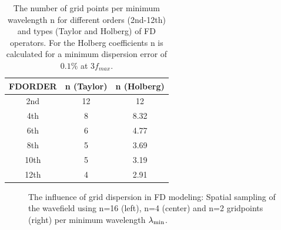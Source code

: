 \documentclass{hitec}
\begin{document}
\begin{table}[hbt]
	\begin{center}
		\begin{tabular}{ccc}\hline \hline
			FDORDER & n (Taylor) & n (Holberg) \\ \hline 
			2nd   &   12       &  12         \\
			4th   &   8        &  8.32       \\
			6th   &   6        &  4.77       \\
			8th   &   5        &  3.69       \\ 
			10th  &   5        &  3.19       \\
			12th  &   4        &  2.91       \\
			\hline \hline
		\end{tabular}
		\caption{\label{grid_disp.2} The number of grid points per minimum wavelength n for different orders (2nd-12th) and types (Taylor and
			Holberg) of FD operators. For the Holberg coefficients n is calculated for a minimum dispersion error of $0.1\%$ at $3 f_{max}$.}
	\end{center}
\end{table} 
\begin{figure}[ht]
	\begin{center}
		\caption{\label{grid_disp_pics} The influence of grid dispersion in FD modeling: Spatial sampling of the wavefield using n=16 (left), n=4 (center) and n=2 gridpoints (right) per minimum wavelength $\rm{\lambda_{min}}$.}
	\end{center}
\end{figure}
\clearpage
\end{document}
